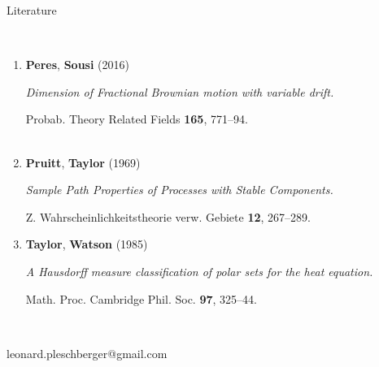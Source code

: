 \documentclass{beamer}
\theoremstyle{plain}
\theoremstyle{definition}
\theoremstyle{remark}
\newcommand{\1}{\mathbbm{1}}
\begin{document}
\begin{frame}{Literature}

\quad\\[15pt]

\begin{enumerate}
\item \textbf{Peres},  \textbf{Sousi } (2016)

\textit{Dimension of Fractional Brownian motion with variable drift.}

Probab.  Theory Related Fields {\bf 165}, 771--94.\\

\quad\\

\item \textbf{Pruitt}, \textbf{Taylor} (1969)

\textit{Sample Path Properties of Processes with Stable Components.}

Z. Wahrscheinlichkeitstheorie verw. Gebiete {\bf 12}, 267--289.\\

\quad

\item \textbf{Taylor},  \textbf{Watson} (1985)

\textit{A Hausdorff measure classification of polar sets for the heat equation.}

Math. Proc. Cambridge Phil. Soc. {\bf 97}, 325--44.

\end{enumerate}

\quad\\[15pt]


\begin{center}
leonard.pleschberger@gmail.com\\[12pt]
\end{center}
\end{frame}
\end{document}
